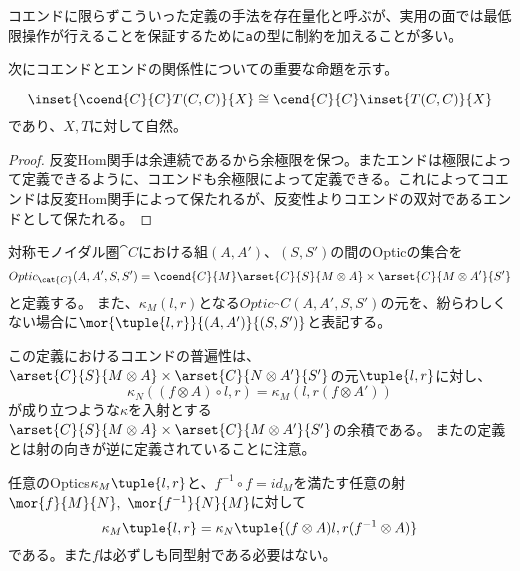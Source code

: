 \documentclass[uplatex,dvipdfmx]{jsarticle}
\newcommand{\pr}[1]{\colorbox[rgb]{0.9,0.9,0.9}{\lstinline{#1}}}
\begin{document}
  コエンドに限らずこういった定義の手法を存在量化と呼ぶが、実用の面では最低限操作が行えることを保証するために\pr{a}の型に制約を加えることが多い。

  次にコエンドとエンドの関係性についての重要な命題を示す。
  \begin{prop}\label{prop-preservation-coend-by-hom-functor}
    \[\inset{\coend{C}{C} T(C,C)}{X}\cong\cend{C}{C}\inset{T(C,C)}{X}\]であり、$X,T$に対して自然。
  \end{prop}
  \begin{proof}
    反変Hom関手は余連続であるから余極限を保つ。またエンドは極限によって定義できるように、コエンドも余極限によって定義できる。これによってコエンドは反変Hom関手によって保たれるが、反変性よりコエンドの双対であるエンドとして保たれる。
  \end{proof}
  \begin{define}[Optics]\label{def-optics}
    対称モノイダル圏$\cat{C}$における組$(A,A')$、$(S,S')$の間のOpticの集合を
    \[Optic_\cat{C}(A,A',S,S')=\coend{C}{M}\arset{C}{S}{M\otimes A}\times \arset{C}{M\otimes A'}{S'}\]と定義する。
    また、$\kappa_M(l,r)$となる$Optic_\cat{C}(A,A',S,S')$の元を、紛らわしくない場合に$\mor{\tuple{l,r}}{(A,A')}{(S,S')}$と表記する。
    \begin{center}
    \end{center}
  \end{define}
  この定義におけるコエンドの普遍性は、$\arset{C}{S}{M\otimes A}\times \arset{C}{N\otimes A'}{S'}$の元$\tuple{l,r}$に対し、
  \[\kappa_N((f\otimes A)\circ l, r)=\kappa_M(l, r(f\otimes A'))\]が成り立つような$\kappa$を入射とする$\arset{C}{S}{M\otimes A}\times \arset{C}{M\otimes A'}{S'}$の余積である。
  また\cite{categories_of_optics}の定義とは射の向きが逆に定義されていることに注意。
  \begin{prop}
    任意のOptics$\kappa_M\tuple{l,r}$と、$f^{-1}\circ f = id_M$を満たす任意の射$\mor{f}{M}{N},\ \mor{f^{-1}}{N}{M}$に対して\[\kappa_M\tuple{l,r} = \kappa_N\tuple{(f\otimes A)l,r(f^{-1}\otimes A)}\]である。また$f$は必ずしも同型射である必要はない。
  \end{prop}
\end{document}
